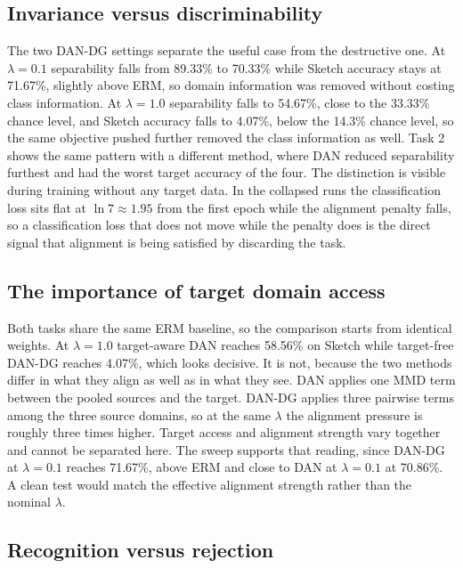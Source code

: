 \documentclass{article}
\begin{document}
\subsection{Invariance versus discriminability}

The two DAN-DG settings separate the useful case from the destructive one. At
$\lambda = 0.1$ separability falls from 89.33\% to 70.33\% while Sketch
accuracy stays at 71.67\%, slightly above ERM, so domain information was
removed without costing class information. At $\lambda = 1.0$ separability
falls to 54.67\%, close to the 33.33\% chance level, and Sketch accuracy
falls to 4.07\%, below the 14.3\% chance level, so the same objective pushed
further removed the class information as well. Task 2 shows the same pattern
with a different method, where DAN reduced separability furthest and had the
worst target accuracy of the four. The distinction is visible during training
without any target data. In the collapsed runs the classification loss sits
flat at $\ln 7 \approx 1.95$ from the first epoch while the alignment penalty
falls, so a classification loss that does not move while the penalty does is
the direct signal that alignment is being satisfied by discarding the task.

\subsection{The importance of target domain access}

Both tasks share the same ERM baseline, so the comparison starts from
identical weights. At $\lambda = 1.0$ target-aware DAN reaches 58.56\% on
Sketch while target-free DAN-DG reaches 4.07\%, which looks decisive. It is
not, because the two methods differ in what they align as well as in what
they see. DAN applies one MMD term between the pooled sources and the target.
DAN-DG applies three pairwise terms among the three source domains, so at the
same $\lambda$ the alignment pressure is roughly three times higher. Target
access and alignment strength vary together and cannot be separated here. The
sweep supports that reading, since DAN-DG at $\lambda = 0.1$ reaches 71.67\%,
above ERM and close to DAN at $\lambda = 0.1$ at 70.86\%. A clean test would
match the effective alignment strength rather than the nominal $\lambda$.

\subsection{Recognition versus rejection}
\end{document}
